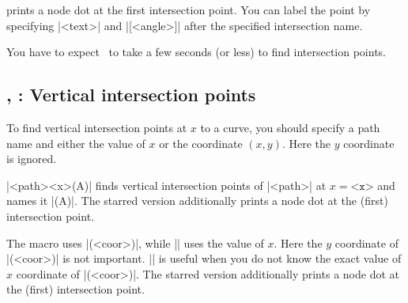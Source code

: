 \icmd{\tzXpoint*} prints a node dot at the first intersection point.
You can label the point by specifying |{<text>}| and |[<angle>]| after the specified intersection name.

\begin{tzcode}{.3}
\end{tzcode}

\remark
You have to expect \Tikz\ to take a few seconds (or less) to find intersection points.

\subsection{\protect\cmd{\tzvXpointat(*)}, \protect\cmd{\tzvXpoint(*)}: Vertical intersection points}
\label{ssi:tzvXpoint}

To find vertical intersection points at $x$ to a curve, you should specify a path name and either the value of $x$ or the coordinate $(x,y)$. Here the $y$ coordinate is ignored.

\icmd{\tzvXpointat}|{<path>}{<x>}(A)| finds vertical intersection points of |<path>| at  $x=\texttt{<x>}$ and names it |(A)|.
The starred version \icmd{\tzvXpointat*} additionally prints a node dot at the (first) intersection point.

The macro \icmd{\tzvXpoint} uses |(<coor>)|, while |\tzvXpointat| uses the value of $x$. Here the $y$ coordinate of |(<coor>)| is not important. |\tzvXpoint| is useful when you do not know the exact value of $x$ coordinate of |(<coor>)|.
The starred version \icmd{\tzvXpoint*} additionally prints a node dot at the (first) intersection point.


\begin{tzcode}{.3}
\end{tzcode}


